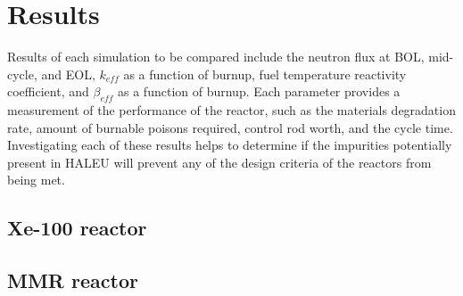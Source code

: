 \section{Results}
Results of each simulation to be compared include the neutron flux at 
\gls{BOL}, mid-cycle, and \gls{EOL}, $k_{eff}$ as a function of burnup, 
fuel temperature reactivity coefficient, and 
$\beta_{eff}$ as a function of burnup. Each parameter provides a 
measurement of the performance of 
the reactor, such as the materials degradation rate, amount of burnable 
poisons required, control rod worth, and the cycle time. Investigating 
each of these results helps to determine if the impurities potentially 
present in \gls{HALEU} will prevent any of the design criteria of the 
reactors from being met. 

\subsection{Xe-100 reactor}

\subsection{MMR reactor}